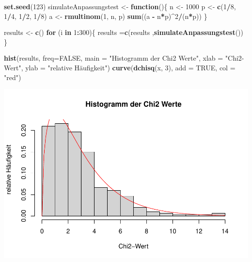 \documentclass[]{article}
\newenvironment{Shaded}{\begin{snugshade}}{\end{snugshade}}
\newcommand{\ControlFlowTok}[1]{\textcolor[rgb]{0.13,0.29,0.53}{\textbf{#1}}}
\newcommand{\DataTypeTok}[1]{\textcolor[rgb]{0.13,0.29,0.53}{#1}}
\newcommand{\DecValTok}[1]{\textcolor[rgb]{0.00,0.00,0.81}{#1}}
\newcommand{\KeywordTok}[1]{\textcolor[rgb]{0.13,0.29,0.53}{\textbf{#1}}}
\newcommand{\NormalTok}[1]{#1}
\newcommand{\OperatorTok}[1]{\textcolor[rgb]{0.81,0.36,0.00}{\textbf{#1}}}
\newcommand{\OtherTok}[1]{\textcolor[rgb]{0.56,0.35,0.01}{#1}}
\newcommand{\StringTok}[1]{\textcolor[rgb]{0.31,0.60,0.02}{#1}}
\begin{document}
\begin{Shaded}
\begin{Highlighting}[]
\KeywordTok{set.seed}\NormalTok{(}\DecValTok{123}\NormalTok{)}
\NormalTok{simulateAnpassungstest <-}\StringTok{ }\ControlFlowTok{function}\NormalTok{()\{}
\NormalTok{  n <-}\StringTok{ }\DecValTok{1000}
\NormalTok{  p <-}\StringTok{ }\KeywordTok{c}\NormalTok{(}\DecValTok{1}\OperatorTok{/}\DecValTok{8}\NormalTok{, }\DecValTok{1}\OperatorTok{/}\DecValTok{4}\NormalTok{, }\DecValTok{1}\OperatorTok{/}\DecValTok{2}\NormalTok{, }\DecValTok{1}\OperatorTok{/}\DecValTok{8}\NormalTok{)}
\NormalTok{  a <-}\StringTok{ }\KeywordTok{rmultinom}\NormalTok{(}\DecValTok{1}\NormalTok{, n, p)}
  \KeywordTok{sum}\NormalTok{((a }\OperatorTok{-}\StringTok{ }\NormalTok{n}\OperatorTok{*}\NormalTok{p)}\OperatorTok{^}\DecValTok{2}\OperatorTok{/}\NormalTok{(n}\OperatorTok{*}\NormalTok{p))}
\NormalTok{\}}
\end{Highlighting}
\end{Shaded}

\begin{Shaded}
\begin{Highlighting}[]
\NormalTok{results <-}\StringTok{ }\KeywordTok{c}\NormalTok{()}
\ControlFlowTok{for}\NormalTok{ (i }\ControlFlowTok{in} \DecValTok{1}\OperatorTok{:}\DecValTok{300}\NormalTok{)\{}
\NormalTok{  results =}\KeywordTok{c}\NormalTok{(results ,}\KeywordTok{simulateAnpassungstest}\NormalTok{())}
\NormalTok{\}}
\end{Highlighting}
\end{Shaded}

\begin{Shaded}
\begin{Highlighting}[]
\KeywordTok{hist}\NormalTok{(results, }\DataTypeTok{freq=}\OtherTok{FALSE}\NormalTok{, }\DataTypeTok{main =} \StringTok{"Histogramm der Chi2 Werte"}\NormalTok{, }\DataTypeTok{xlab =} \StringTok{"Chi2-Wert"}\NormalTok{, }\DataTypeTok{ylab =} \StringTok{"relative Häufigkeit"}\NormalTok{)}
\KeywordTok{curve}\NormalTok{(}\KeywordTok{dchisq}\NormalTok{(x, }\DecValTok{3}\NormalTok{), }\DataTypeTok{add =} \OtherTok{TRUE}\NormalTok{, }\DataTypeTok{col =} \StringTok{"red"}\NormalTok{)}
\end{Highlighting}
\end{Shaded}

\includegraphics{Test_files/figure-latex/unnamed-chunk-3-1.pdf}
\end{document}
